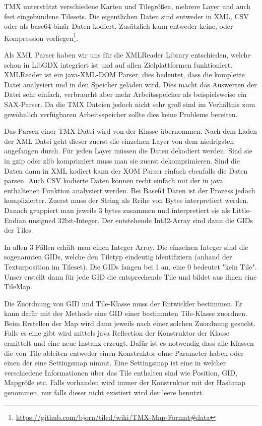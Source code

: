 TMX unterstützt verschiedene Karten und Tilegrößen, mehrere Layer und auch fest eingebundene Tilesets. Die eigentlichen Daten sind entweder in XML, CSV oder als base64-binär Daten kodiert. Zusätzlich kann entweder keine,  oder  Kompression vorliegen\footnote{\url{https://github.com/bjorn/tiled/wiki/TMX-Map-Format\#data}}.

Als XML Parser haben wir uns für die XMLReader Library entschieden, welche schon in LibGDX integriert ist und auf allen Zielplattformen funktioniert. XMLReader ist ein java-XML-DOM Parser, dies bedeutet, dass die komplette Datei analysiert und in den Speicher geladen wird. Dies macht das Auswerten der Datei sehr einfach, verbraucht aber mehr Arbeitsspeicher als beispielsweise ein SAX-Parser. Da die TMX Dateien jedoch nicht sehr groß sind im Verhältnis zum gewöhnlich verfügbaren Arbeitsspeicher sollte dies keine Probleme bereiten.

Das Parsen einer TMX Datei wird von der Klasse  übernommen. Nach dem Laden der XML Datei geht dieser zuerst die einzelnen Layer von dem niedrigsten angefangen durch. Für jeden Layer müssen die Daten dekodiert werden. Sind sie in gzip oder zlib komprimiert muss man sie zuerst dekomprimieren. Sind die Daten dann in XML kodiert kann der XOM Parser einfach ebenfalls die Daten parsen. Auch CSV kodierte Daten können recht einfach mit der in java enthaltenen  Funktion analysiert werden.
Bei Base64 Daten ist der Prozess jedoch komplizierter. Zuerst muss der String als Reihe von Bytes interpretiert werden. Danach gruppiert man jeweils 3 bytes zusammen und interpretiert sie als Little-Endian unsigned 32bit-Integer. Der entstehende Int32-Array sind dann die GIDs der Tiles.

In allen 3 Fällen erhält man einen Integer Array. Die einzelnen Integer sind die sogenannten GIDs, welche den Tiletyp eindeutig identifiziern (anhand der Texturposition im Tileset).
Die GIDs fangen bei 1 an, eine 0 bedeutet "kein Tile". Unser  erstellt dann für jede GID die entsprechende Tile und bildet aus ihnen eine TileMap.

Die Zuordnung von GID und Tile-Klasse muss der Entwickler bestimmen. Er kann dafür mit der Methode  eine GID einer bestimmten Tile-Klasse zuordnen. Beim Erstellen der Map wird dann jeweils nach einer solchen Zuordnung gesucht. Falls es eine gibt wird mittels java Reflection der Konstruktor der Klasse ermittelt und eine neue Instanz erzeugt. Dafür ist es notwendig dass alle Klassen die von Tile ableiten entweder einen Konstruktor ohne Parameter haben oder einen der eine Settingsmap nimmt. Eine Settingsmap ist eine  in welcher verschiedene Informationen über das Tile enthalten sind wie Position, GID, Mapgröße etc. Falls vorhanden wird immer der Konstruktor mit der Hashmap genommen, nur falls dieser nicht existiert wird der leere benutzt.

